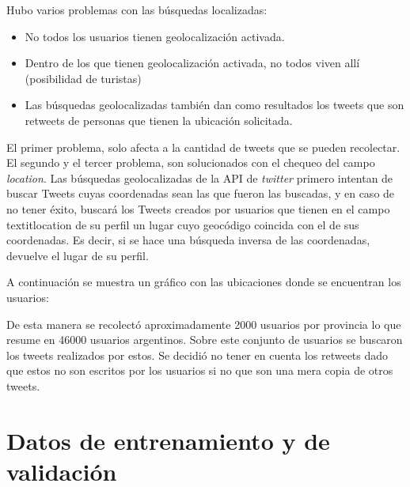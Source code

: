 Hubo varios problemas con las búsquedas localizadas:
\begin{itemize}
    \item No todos los usuarios tienen geolocalización activada.
    \item Dentro de los que tienen geolocalización activada, no todos viven allí (posibilidad de turistas)
    \item Las búsquedas geolocalizadas también dan como resultados los tweets que son retweets de personas que tienen la ubicación solicitada.
\end{itemize}
El primer problema, solo afecta a la cantidad de tweets que se pueden recolectar.
El segundo y el tercer problema, son solucionados con el chequeo del campo \textit{location}.
Las búsquedas geolocalizadas de la API de \textit{twitter} primero intentan de buscar Tweets cuyas coordenadas sean las que fueron las buscadas, y en caso de no tener éxito, buscará los Tweets creados por usuarios que tienen en el campo textit{location} de su perfil un lugar cuyo geocódigo coincida con el de sus coordenadas. Es decir, si se hace una búsqueda inversa de las coordenadas, devuelve el lugar de su perfil.  

A continuación se muestra un gráfico con las ubicaciones donde se encuentran los usuarios:



De esta manera se recolectó aproximadamente 2000 usuarios por provincia lo que resume en 46000 usuarios argentinos. Sobre este conjunto de usuarios se buscaron los tweets realizados por estos. Se decidió no tener en cuenta los retweets dado que estos no son escritos por los usuarios si no que son una mera copia de otros tweets. %

\section{Datos de entrenamiento y de validación}

